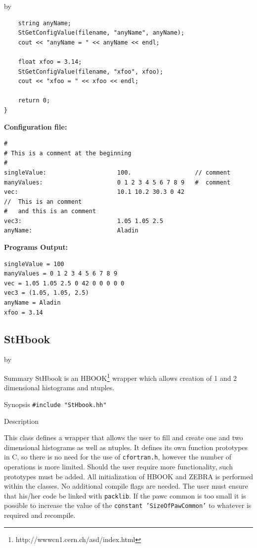 \documentclass[twoside]{article}
\newcommand{\comp}[1]{\texttt{#1}}%
\newcommand{\entrylabel}[1]{\mbox{\textbf{{#1}}}\hfil}%
\newenvironment{entry}
{\begin{list}{}%
    {\renewcommand{\makelabel}{\entrylabel}%
     \setlength{\labelwidth}{90pt}%
     \setlength{\leftmargin}{\labelwidth}
     \advance\leftmargin by \labelsep%
      }%
    }%
  {\end{list}}
\newcommand{\Entrylabel}[1]%
{\raisebox{0pt}[1ex][0pt]{\makebox[\labelwidth][l]%
    {\parbox[t]{\labelwidth}{\hspace{0pt}\textbf{{#1}}}}}}
\newenvironment{Entry}%
{\renewcommand{\entrylabel}{\Entrylabel}\begin{entry}}%
  {\end{entry}}
\begin{document}
\begin{description}
\begin{Entry}
{\begin{verbatim}
    string anyName;
    StGetConfigValue(filename, "anyName", anyName);
    cout << "anyName = " << anyName << endl;
    
    float xfoo = 3.14;
    StGetConfigValue(filename, "xfoo", xfoo);
    cout << "xfoo = " << xfoo << endl;

    return 0;
}
\end{verbatim}
{\bf Configuration file:}  
\begin{verbatim}
#
# This is a comment at the beginning
#
singleValue:                    100.                  // comment
manyValues:                     0 1 2 3 4 5 6 7 8 9   #  comment
vec:                            10.1 10.2 30.3 0 42
//  This is an comment
#   and this is an comment
vec3:                           1.05 1.05 2.5
anyName:                        Aladin
\end{verbatim}
{\bf Programs Output:}
\begin{verbatim}
singleValue = 100
manyValues = 0 1 2 3 4 5 6 7 8 9 
vec = 1.05 1.05 2.5 0 42 0 0 0 0 0 
vec3 = (1.05, 1.05, 2.5)
anyName = Aladin
xfoo = 3.14
\end{verbatim}
}   
\end{Entry}
\clearpage

%
%
\subsection{StHbook } \label{StHbook}
\begin{Entry}
\item[Summary]
    StHbook is an HBOOK\footnote{http://wwwcn1.cern.ch/asd/index.html}
    wrapper which allows creation of 1 and 2 dimensional histograms
    and ntuples.

\item[Synopsis]
    \verb+#include "StHbook.hh"+\\    
    
\item[Description]   
    
  This class defines a wrapper that allows the user to fill and
  create one and two dimensional histograms as well as ntuples.
  It defines its own function prototypes in C, so there is no
  need for the use of \texttt{cfortran.h}, however
  the number of operations is more limited.  Should the user require
  more functionality, such prototypes must be added.
  All initialization of HBOOK and ZEBRA is performed within the
  classes.  No additional compile flags are needed.  The user
  must ensure that his/her code be linked with \comp{packlib}.
  If the \/pawc\/ common is too small it is possible to increase
  the value of the  \texttt{constant 'SizeOfPawCommon'} to whatever
  is required and recompile.


\end{Entry}
\end{description}
\end{document}
